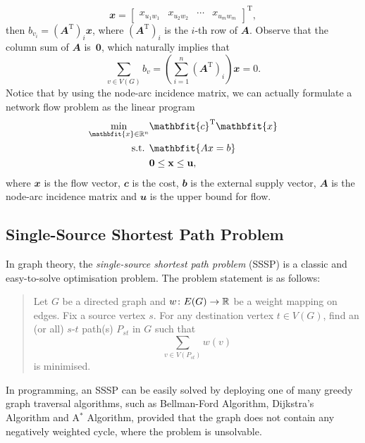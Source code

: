 \documentclass[math, code]{amznotes}
\theoremstyle{remark}
\begin{document}
\begin{equation*}
    \mathbfit{x} = \begin{bmatrix}
        x_{u_1w_1} & x_{u_2w_2} & \cdots & x_{u_mw_m}
    \end{bmatrix}^{\mathrm{T}},
\end{equation*}
then $b_{v_i} = \left(\mathbfit{A}^{\mathrm{T}}\right)_{i}\mathbfit{x}$, where $\left(\mathbfit{A}^{\mathrm{T}}\right)_{i}$ is the $i$-th row of $\mathbfit{A}$. Observe that the column sum of $\mathbfit{A}$ is~$\mathbf{0}$, which naturally implies that 
\begin{equation*}
    \sum_{v \in V(G)}b_v = \left(\sum_{i = 1}^n\left(\mathbfit{A}^{\mathrm{T}}\right)_{i}\right)\mathbfit{x} = 0.
\end{equation*}
Notice that by using the node-arc incidence matrix, we can actually formulate a network flow problem as the linear program 
\begin{align*}
    \min_{\mathbfit{x} \in \R^n} & \mathbfit{c}^{\mathrm{T}}\mathbfit{x} \\
    \textrm{s.t. } & \mathbfit{Ax = b} \\
    & \mathbf{0 \leq x \leq u},
\end{align*}
where $\mathbfit{x}$ is the flow vector, $\mathbfit{c}$ is the cost, $\mathbfit{b}$ is the external supply vector, $\mathbfit{A}$ is the node-arc incidence matrix and $\mathbfit{u}$ is the upper bound for flow.
\subsection{Single-Source Shortest Path Problem}
In graph theory, the \textit{single-source shortest path problem} (SSSP) is a classic and easy-to-solve optimisation problem. The problem statement is as follows:
\begin{quote}
    Let $G$ be a directed graph and $w \colon E(G) \to \mathbb{R}$ be a weight mapping on edges. Fix a source vertex $s$. For any destination vertex $t \in V(G)$, find an (or all) $s$-$t$ path(s) $P_{st}$ in $G$ such that 
    \begin{equation*}
        \sum_{v \in V(P_{st})}w(v)
    \end{equation*}
    is minimised.
\end{quote}
In programming, an SSSP can be easily solved by deploying one of many greedy graph traversal algorithms, such as Bellman-Ford Algorithm, Dijkstra's Algorithm and A$^*$ Algorithm, provided that the graph does not contain any negatively weighted cycle, where the problem is unsolvable.
\end{document}
